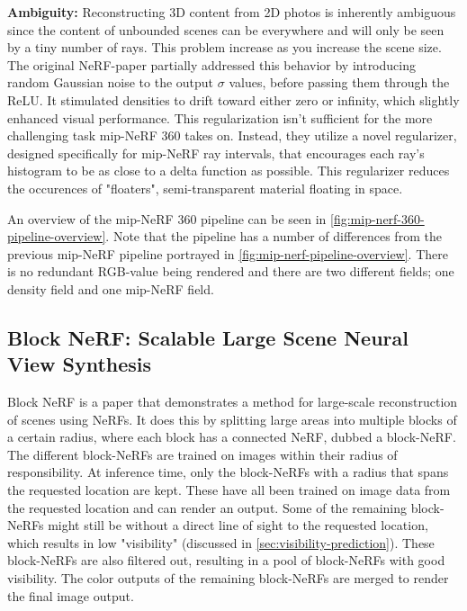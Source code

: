 \textbf{Ambiguity:}
Reconstructing 3D content from 2D photos is inherently ambiguous since the content of unbounded scenes can be everywhere and will only be seen by a tiny number of rays. This problem increase as you increase the scene size. The original NeRF-paper partially addressed this behavior by introducing random Gaussian noise to the output $\sigma$ values, before passing them through the ReLU. It stimulated densities to drift toward either zero or infinity, which slightly enhanced visual performance. This regularization isn't sufficient for the more challenging task mip-NeRF 360 takes on. Instead, they utilize a novel regularizer, designed specifically for mip-NeRF ray intervals, that encourages each ray's histogram to be as close to a delta function as possible. This regularizer reduces the occurences of "floaters", semi-transparent material floating in space.



An overview of the mip-NeRF 360 pipeline can be seen in \autoref{fig:mip-nerf-360-pipeline-overview}. Note that the pipeline has a number of differences from the previous mip-NeRF pipeline portrayed in \autoref{fig:mip-nerf-pipeline-overview}. There is no redundant RGB-value being rendered and there are two different fields; one density field and one mip-NeRF field.



\subsection{Block NeRF: Scalable Large Scene Neural View Synthesis}
Block NeRF is a paper that demonstrates a method for large-scale reconstruction of scenes using NeRFs. It does this by splitting large areas into multiple blocks of a certain radius, where each block has a connected NeRF, dubbed a block-NeRF. The different block-NeRFs are trained on images within their radius of responsibility. At inference time, only the block-NeRFs with a radius that spans the requested location are kept. These have all been trained on image data from the requested location and can render an output. Some of the remaining block-NeRFs might still be without a direct line of sight to the requested location, which results in low "visibility" (discussed in \autoref{sec:visibility-prediction}). These block-NeRFs are also filtered out, resulting in a pool of block-NeRFs with good visibility. The color outputs of the remaining block-NeRFs are merged to render the final image output.


